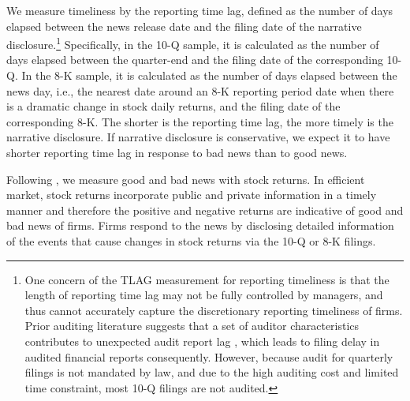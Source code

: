 \documentclass[letterpaper,11pt]{article}
\begin{document}
\begin{spacing}{1.5}
We measure timeliness by the reporting time lag, defined as the number of days elapsed between the news release date and the filing date of the narrative disclosure.\footnote{One concern of the TLAG measurement for reporting timeliness is that the length of reporting time lag may not be fully controlled by managers, and thus cannot accurately capture the discretionary reporting timeliness of firms. Prior auditing literature suggests that a set of auditor characteristics contributes to unexpected audit report lag , which leads to filing delay in audited financial reports consequently. However, because audit for quarterly filings is not mandated by law, and due to the high auditing cost and limited time constraint, most 10-Q filings are not audited.} Specifically, in the 10-Q sample, it is calculated as the number of days elapsed between the quarter-end and the filing date of the corresponding 10-Q. In the 8-K sample, it is calculated as the number of days elapsed between the news day, i.e., the nearest date around an 8-K reporting period date when there is a dramatic change in stock daily returns, and the filing date of the corresponding 8-K. The shorter is the reporting time lag, the more timely is the narrative disclosure. If narrative disclosure is conservative, we expect it to have shorter reporting time lag in response to bad news than to good news.

Following , we measure good and bad news with stock returns. In efficient market, stock returns incorporate public and private information in a timely manner and therefore the positive and negative returns are indicative of good and bad news of firms. %
Firms respond to the news by disclosing detailed information of the events that cause changes in stock returns via the 10-Q or 8-K filings. 


\end{spacing}
\end{document}
